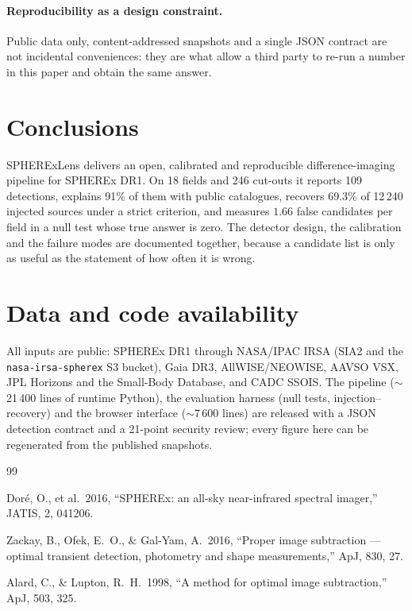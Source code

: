 \documentclass[11pt,a4paper]{article}
\newcommand{\code}[1]{\texttt{\small #1}}
\begin{document}
{\paragraph{Reproducibility as a design constraint.} Public data only, content-addressed snapshots and
a single JSON contract are not incidental conveniences: they are what allow a third party to re-run a
number in this paper and obtain the same answer.

\section{Conclusions}

SPHERExLens delivers an open, calibrated and reproducible difference-imaging pipeline for SPHEREx
DR1. On 18 fields and 246 cut-outs it reports 109 detections, explains 91\% of them with public
catalogues, recovers 69.3\% of 12\,240 injected sources under a strict criterion, and measures
$1.66$ false candidates per field in a null test whose true answer is zero. The detector design, the
calibration and the failure modes are documented together, because a candidate list is only as
useful as the statement of how often it is wrong.

\section*{Data and code availability}
All inputs are public: SPHEREx DR1 through NASA/IPAC IRSA (SIA2 and the \code{nasa-irsa-spherex}
S3 bucket), Gaia DR3, AllWISE/NEOWISE, AAVSO VSX, JPL Horizons and the Small-Body Database, and CADC
SSOIS. The pipeline ($\sim$21\,400 lines of runtime Python), the evaluation harness (null tests,
injection--recovery) and the browser interface ($\sim$7\,600 lines) are released with a JSON
detection contract and a 21-point security review; every figure here can be regenerated from the
published snapshots.

\begin{thebibliography}{99}\small

 Dor\'e, O., et al.\ 2016, ``SPHEREx: an all-sky near-infrared spectral imager,''
JATIS, 2, 041206.

 Zackay, B., Ofek, E.~O., \& Gal-Yam, A.\ 2016, ``Proper image subtraction --- optimal
transient detection, photometry and shape measurements,'' ApJ, 830, 27.

 Alard, C., \& Lupton, R.~H.\ 1998, ``A method for optimal image subtraction,''
ApJ, 503, 325.


\end{thebibliography}}
\end{document}

